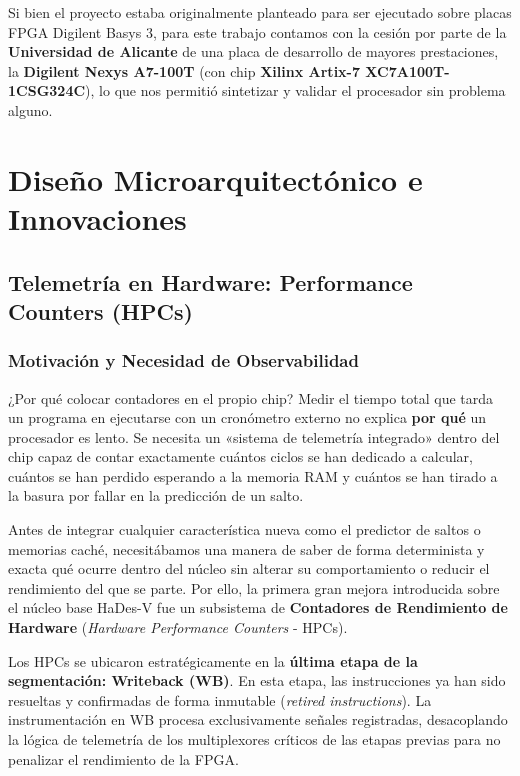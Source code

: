 \documentclass[10pt,a4paper]{article}
\begin{document}
Si bien el proyecto estaba originalmente planteado para ser ejecutado sobre placas FPGA Digilent Basys 3, para este trabajo contamos con la cesión por parte 
de la \textbf{Universidad de Alicante} de una placa de desarrollo de mayores prestaciones, la \textbf{Digilent Nexys A7-100T} (con chip 
\textbf{Xilinx Artix-7 XC7A100T-1CSG324C}), lo que nos permitió sintetizar y validar el procesador sin problema alguno.


\section{Diseño Microarquitectónico e Innovaciones}

\subsection{Telemetría en Hardware: Performance Counters (HPCs)}

\subsubsection{Motivación y Necesidad de Observabilidad}
\begin{conceptbox}{¿Por qué colocar contadores en el propio chip?}
    Medir el tiempo total que tarda un programa en ejecutarse con un cronómetro externo no explica \textbf{por qué} un procesador es lento. Se necesita un «sistema
    de telemetría integrado» dentro del chip capaz de contar exactamente cuántos ciclos se han dedicado a calcular, cuántos se han perdido esperando a la memoria RAM 
    y cuántos se han tirado a la basura por fallar en la predicción de un salto.
\end{conceptbox}

Antes de integrar cualquier característica nueva como el predictor de saltos o memorias caché, necesitábamos una manera de saber de forma determinista y exacta 
qué ocurre dentro del núcleo sin alterar su comportamiento o reducir el rendimiento del que se parte. Por ello, la primera gran mejora introducida sobre el 
núcleo base HaDes-V fue un subsistema de \textbf{Contadores de Rendimiento de Hardware} (\textit{Hardware Performance Counters} - HPCs).

Los HPCs se ubicaron estratégicamente en la \textbf{última etapa de la segmentación: Writeback (WB)}. En esta etapa, las instrucciones ya han sido resueltas y 
confirmadas de forma inmutable (\textit{retired instructions}). La instrumentación en WB procesa exclusivamente señales registradas, desacoplando la lógica de 
telemetría de los multiplexores críticos de las etapas previas para no penalizar el rendimiento de la FPGA.
\end{document}
